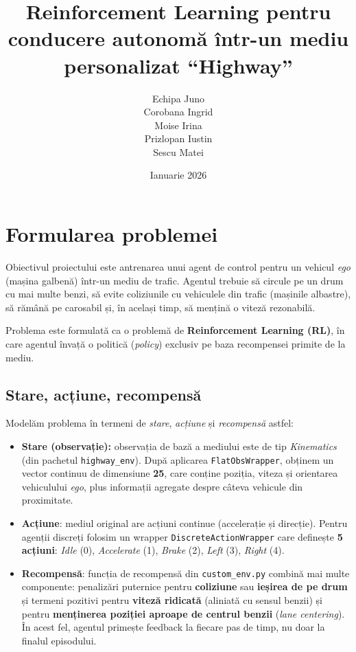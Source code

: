 \documentclass[11pt,a4paper]{article}
\title{Reinforcement Learning pentru conducere autonomă într-un mediu personalizat ``Highway''}
\author{Echipa Juno \\ Corobana Ingrid \\ Moise Irina \\ Prizlopan Iustin \\ Sescu Matei}
\date{Ianuarie 2026}
\begin{document}
\maketitle

\section{Formularea problemei}

Obiectivul proiectului este antrenarea unui agent de control pentru un vehicul \emph{ego} (mașina galbenă)
într-un mediu de trafic. Agentul trebuie să circule pe un drum cu mai multe benzi, să evite
coliziunile cu vehiculele din trafic (mașinile albastre), să rămână pe carosabil și, în același timp,
să mențină o viteză rezonabilă.

Problema este formulată ca o problemă de \textbf{Reinforcement Learning (RL)}, în care agentul învață
o politică (\emph{policy}) exclusiv pe baza recompensei primite de la mediu.

\subsection{Stare, acțiune, recompensă}

Modelăm problema în termeni de \emph{stare}, \emph{acțiune} și \emph{recompensă} astfel:
\begin{itemize}
  \item \textbf{Stare (observație):} observația de bază a mediului este de tip \emph{Kinematics}
  (din pachetul \texttt{highway\_env}). După aplicarea \texttt{FlatObsWrapper}, obținem un vector
  continuu de dimensiune \textbf{25}, care conține poziția, viteza și orientarea vehiculului \emph{ego},
  plus informații agregate despre câteva vehicule din proximitate.
  \item \textbf{Acțiune}: mediul original are acțiuni continue (accelerație și direcție). Pentru agenții
  discreți folosim un wrapper \texttt{DiscreteActionWrapper} care definește \textbf{5 acțiuni}:
  \emph{Idle} (0), \emph{Accelerate} (1), \emph{Brake} (2), \emph{Left} (3), \emph{Right} (4).
  \item \textbf{Recompensă}: funcția de recompensă din \texttt{custom\_env.py} combină mai multe
  componente: penalizări puternice pentru \textbf{coliziune} sau \textbf{ieșirea de pe drum} și
  termeni pozitivi pentru \textbf{viteză ridicată} (aliniată cu sensul benzii) și pentru
  	\textbf{menținerea poziției aproape de centrul benzii} (\emph{lane centering}). În acest fel,
  agentul primește feedback la fiecare pas de timp, nu doar la finalul episodului.
\end{itemize}
\end{document}
